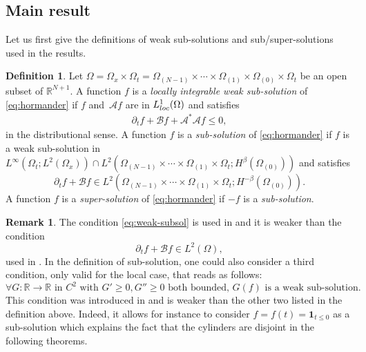 \documentclass[10pt,a4paper]{amsart}
\newcommand{\loc}{\textup{loc}}
\theoremstyle{definition}
\newtheorem{definition}[theorem]{Definition}
\newtheorem{remark}[theorem]{Remark}
\newcommand{\cA}{{\mathcal A}}
\newcommand{\cB}{{\mathcal B}}
\begin{document}
\subsection{Main result}
\label{sec:aim}
Let us first give the definitions of weak sub-solutions and sub/super-solutions used in the results.
\begin{definition}
\label{def_weak_sol}
Let $\Omega=\Omega_x\times \Omega_t=\Omega_{(N-1)}\times \cdots \times \Omega_{(1)}\times \Omega_{(0)}\times \Omega_t$ be an open subset of $\mathbb{R}^{N+1}$.
A function $f$ is a \emph{locally integrable weak sub-solution} of \eqref{eq:hormander} if $f$ and~$\cA f$ are in $L^{1}_{\loc}(\Omega)$ and satisfies
\begin{align*}
\partial_t f + \cB f + \cA^* \cA f \leq 0,
\end{align*}
in the distributional sense. A function $f$ is a \emph{sub-solution} of \eqref{eq:hormander} if $f$ is a weak sub-solution in $L^\infty(\Omega_{t};L^2(\Omega_x))\cap L^2(\Omega_{(N-1)}\times \cdots \times \Omega_{(1)}\times \Omega_t; H^{\beta}(\Omega_{(0)}))$ and satisfies
\begin{equation}\label{eq:weak-subsol}
\partial_t f + \cB f\in L^2(\Omega_{(N-1)}\times \cdots \times \Omega_{(1)}\times \Omega_t; H^{-\beta}(\Omega_{(0)})).
\end{equation}
A function $f$ is a \emph{super-solution} of \eqref{eq:hormander} if $-f$ is a \emph{sub-solution}.
\end{definition}
\begin{remark}
The condition \eqref{eq:weak-subsol} is used in \cite{GIMV} and it is weaker than the condition
\[
\partial_t f + \cB f\in L^{2}(\Omega),\]
used in \cite{PP}. In the definition of sub-solution, one could also consider a third condition, only valid for the local case, that reads as follows:
\[
\forall G:\mathbb{R}\rightarrow \mathbb{R} \textrm{ in } C^2\textrm{ with } G'\geq 0, G''\geq 0 \textrm{ both bounded, } G(f) \textrm{ is a weak sub-solution}.\]
This condition was introduced in \cite{guerand-mouhot} and is weaker than the other two listed in the definition above. Indeed, it allows for instance to consider $f=f(t)=\mathbf{1}_{t\leq 0}$ as a sub-solution which explains the fact that the cylinders are disjoint in the following theorems.
\end{remark}
\end{document}
